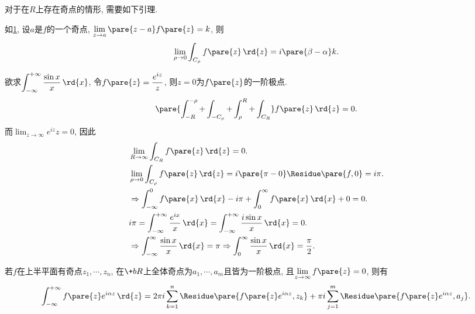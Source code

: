 \documentclass[../ComplexVariable.tex]{subfiles}
\begin{document}
\begin{figure}[ht]
    \centering
    \caption{}
    \label{fig:环绕奇点的弧的积分}
\end{figure}
对于在$R$上存在奇点的情形, 需要如下引理.
\begin{lemma}
    如\cref{fig:环绕奇点的弧的积分}, 设$a$是$f$的一个奇点, $\displaystyle \lim_{z\rightarrow a}\pare{z-a}f\pare{z} = k$, 则
    \[ \lim_{\rho\rightarrow 0} \int_{C_\rho} f\pare{z}\,\rd{z} = i\pare{\beta - \alpha} k. \]
\end{lemma}
\begin{sample}
    \begin{ex}
        欲求$\displaystyle \int_{-\infty}^{+\infty} \frac{\sin x}{x}\,\rd{x}$, 令$f\pare{z} = \displaystyle \frac{e^{iz}}{z}$, 则$z = 0$为$f\pare{z}$的一阶极点.
        \[ \pare{\int_{-R}^{-\rho} + \int_{-C_\rho} + \int_\rho^R + \int_{C_R}}f\pare{z}\,\rd{z} = 0. \]
        而$\displaystyle \lim_{z\rightarrow \infty}{e^{iz}}{z} = 0$, 因此
        \begin{align*}
            &\lim_{R\rightarrow\infty} \int_{C_R}f\pare{z}\,\rd{z} = 0. \\
            &\lim_{\rho\rightarrow 0} \int_{C_\rho} f\pare{z}\,\rd{z} = i\pare{\pi - 0}\Residue\pare{f,0} = i\pi. \\
            &\Rightarrow \int_{-\infty}^0 f\pare{x}\,\rd{x} - i\pi + \int_0^\infty f\pare{x}\,\rd{x} + 0 = 0. \\
            &i\pi = \int_{-\infty}^{+\infty} \frac{e^{ix}}{x}\,\rd{x} = \int_{-\infty}^{+\infty} \frac{i\sin x}{x}\,\rd{x} = 0. \\
            &\Rightarrow \int_{-\infty}^{\infty} \frac{\sin x}{x}\,\rd{x} = \pi \Rightarrow \int_0^\infty \frac{\sin x}{x}\,\rd{x} = \frac{\pi}{2}.
        \end{align*}
    \end{ex}
\end{sample}
\begin{proposition}
    若$f$在上半平面有奇点$z_1,\cdots,z_n$, 在$\+bR$上全体奇点为$a_1,\cdots,a_m$且皆为一阶极点, 且$\displaystyle \lim_{z\rightarrow\infty} f\pare{z}= 0$, 则有
    \[ \int_{-\infty}^{+\infty} f\pare{z}e^{i\alpha z}\,\rd{z} = 2\pi i\sum_{k=1}^n \Residue\pare{f\pare{z}e^{i\alpha z},z_k} + \pi i \sum_{j=1}^m \Residue\pare{f\pare{z}e^{i\alpha z}, a_j}. \]
\end{proposition}
\end{document}
